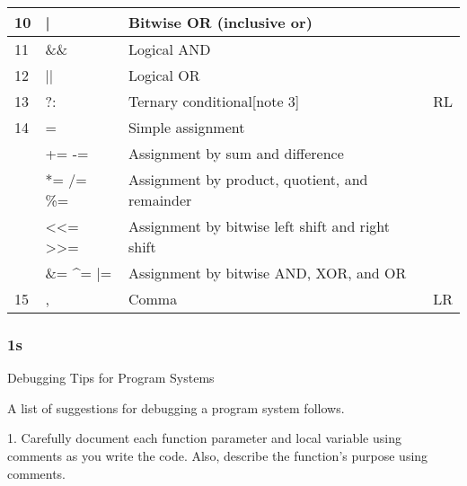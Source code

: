 \documentclass{extarticle}
\begin{document}
\begin{tabular}{|l|l|l|l|}
10             & |                                                     & Bitwise OR (inclusive or)                                              &               \\ \hline
11             & \&\&                                                  & Logical AND                                                            &               \\ \hline
12             & ||                                                    & Logical OR                                                             &               \\ \hline
13             & ?:                                                    & Ternary conditional{[}note 3{]}                                        & RL            \\ \hline
14 & =                                                     & Simple assignment                                                      &               \\
               & += -=                                                 & Assignment by sum and difference                                       &               \\
               & *= /= \%=                                             & Assignment by product, quotient, and remainder                         &               \\
               & \textless{}\textless{}= \textgreater{}\textgreater{}= & Assignment by bitwise left shift and right shift                       &               \\
               & \&= \textasciicircum{}= |=                            & Assignment by bitwise AND, XOR, and OR                                 &               \\ \hline
15             & ,                                                     & Comma                                                                  & LR            \\ \hline
\end{tabular}


\subsubsection{1s}

Debugging Tips for Program Systems

A list of suggestions for debugging a program system follows.

1. Carefully document each function parameter and local variable using comments as you write the code. Also, describe the function’s purpose using comments.
\end{document}
